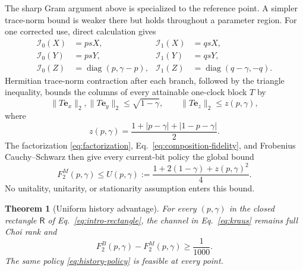 \documentclass[11pt]{article}
\newtheorem{theorem}{Theorem}
\newcommand{\cI}{\mathcal I}
\newcommand{\diag}{\operatorname{diag}}
\newcommand{\ee}{\bm e}
\begin{document}
The sharp Gram argument above is specialized to the reference point. A simpler
trace-norm bound is weaker there but holds throughout a parameter region. For one
corrected use, direct calculation gives
\begin{align}
 \cI_0(X)&=psX, & \cI_1(X)&=qsX,\nonumber\\
 \cI_0(Y)&=psY, & \cI_1(Y)&=qsY,\label{eq:pauli-images}\\
 \cI_0(Z)&=\diag(p,\gamma-p), &
 \cI_1(Z)&=\diag(q-\gamma,-q).\nonumber
\end{align}
Hermitian trace-norm contraction after each branch, followed by the triangle
inequality, bounds the columns of every attainable one-clock block $T$ by
\begin{equation}
 \|T\ee_x\|_2,\|T\ee_y\|_2\le\sqrt{1-\gamma},
 \qquad
 \|T\ee_z\|_2\le z(p,\gamma),
 \label{eq:column-bounds}
\end{equation}
where
\begin{equation}
 z(p,\gamma)=\frac{1+|p-\gamma|+|1-p-\gamma|}{2}.
 \label{eq:z-general}
\end{equation}
The factorization \eqref{eq:factorization}, Eq.~\eqref{eq:composition-fidelity},
and Frobenius Cauchy--Schwarz then give every current-bit policy the global bound
\begin{equation}
 F_2^M(p,\gamma)\le
 U(p,\gamma):=\frac{1+2(1-\gamma)+z(p,\gamma)^2}{4}.
 \label{eq:uniform-upper}
\end{equation}
No unitality, unitarity, or stationarity assumption enters this bound.

\begin{theorem}[Uniform history advantage]
\label{thm:rectangle}
For every $(p,\gamma)$ in the closed rectangle $\mathsf R$ of
Eq.~\eqref{eq:intro-rectangle}, the channel in Eq.~\eqref{eq:kraus} remains full
Choi rank and
\begin{equation}
 F_2^B(p,\gamma)-F_2^M(p,\gamma)\ge\frac1{1000}.
 \label{eq:uniform-gap}
\end{equation}
The same policy \eqref{eq:history-policy} is feasible at every point.
\end{theorem}
\end{document}
